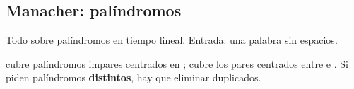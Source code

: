 \subsection{Manacher: palíndromos}\label{rec:manacher}

Todo sobre palíndromos en tiempo lineal. Entrada: una palabra sin espacios.




 cubre palíndromos impares centrados en ;
 cubre los pares centrados entre  e .
Si piden palíndromos \textbf{distintos}, hay que eliminar duplicados.